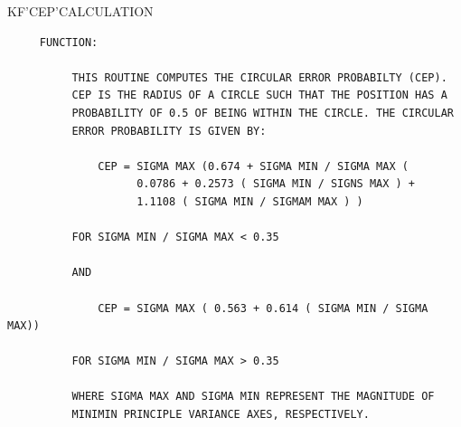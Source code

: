 \begin{frame}
KF'CEP'CALCULATION
\begin{verbatim}
     FUNCTION:

          THIS ROUTINE COMPUTES THE CIRCULAR ERROR PROBABILTY (CEP).
          CEP IS THE RADIUS OF A CIRCLE SUCH THAT THE POSITION HAS A
          PROBABILITY OF 0.5 OF BEING WITHIN THE CIRCLE. THE CIRCULAR
          ERROR PROBABILITY IS GIVEN BY:

              CEP = SIGMA MAX (0.674 + SIGMA MIN / SIGMA MAX (
                    0.0786 + 0.2573 ( SIGMA MIN / SIGNS MAX ) +
                    1.1108 ( SIGMA MIN / SIGMAM MAX ) )

          FOR SIGMA MIN / SIGMA MAX < 0.35

          AND

              CEP = SIGMA MAX ( 0.563 + 0.614 ( SIGMA MIN / SIGMA MAX))

          FOR SIGMA MIN / SIGMA MAX > 0.35

          WHERE SIGMA MAX AND SIGMA MIN REPRESENT THE MAGNITUDE OF
          MINIMIN PRINCIPLE VARIANCE AXES, RESPECTIVELY.

\end{verbatim}
\end{frame}
